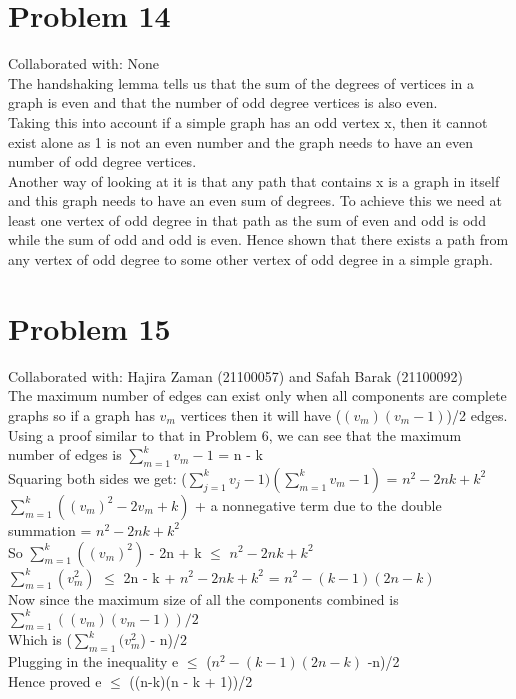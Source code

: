 \documentclass{article}
\begin{document}
\section{Problem 14}
Collaborated with: None\\
The handshaking lemma tells us that the sum of the degrees of vertices in a graph is even and that the number of odd degree vertices is also even. \\
Taking this into account if a simple graph has an odd vertex x, then it cannot exist alone as 1 is not an even number and the graph needs to have an even number of odd degree vertices. \\ 
Another way of looking at it is that any path that contains x is a graph in itself and this graph needs to have an even sum of degrees. To achieve this we need at least one vertex of odd degree in that path as the sum of even and odd is odd while the sum of odd and odd is even. Hence shown that there exists a path from any vertex of odd degree to some other vertex of odd degree in a simple graph.


\section{Problem 15}
Collaborated with: Hajira Zaman (21100057) and Safah Barak (21100092)\\
The maximum number of edges can exist only when all components are complete graphs so if a graph has $v_{m}$ vertices then it will have ($(v_{m})(v_{m}-1)$)/2 edges. \\Using a proof similar to that in Problem 6, we can see that the maximum number of edges is  $\sum_{m=1}^{k} v_{m}-1$ = n - k\\
Squaring both sides we get:
 ($\sum_{j=1}^{k} v_{j}-1)(\sum_{m=1}^{k} v_{m}-1)$ = $n^{2} - 2nk + k^{2}$ \\
 $\sum_{m=1}^{k} ((v_{m})^{2}- 2v_{m} + k)$ + a nonnegative term due to the double summation = $n^{2} - 2nk + k^{2}$  \\
So  $\sum_{m=1}^{k} ((v_{m})^{2})$ - 2n + k $\leq$ $n^{2} - 2nk + k^{2}$  \\
$\sum_{m=1}^{k} (v_{m}^{2})$ $\leq$ 2n - k + $n^{2} - 2nk + k^{2}$ = $n^{2} - (k-1)(2n-k)$  \\
Now since the maximum size of all the components combined is $\sum_{m=1}^{k} ((v_{m})(v_{m}-1))/2 $ \\
Which is ($\sum_{m=1}^{k} (v_{m}^{2}$) - n)/2 \\
Plugging in the inequality e $\leq$ ($n^{2} - (k-1)(2n-k)$ -n)/2 \\
Hence proved e $\leq$ ((n-k)(n - k + 1))/2 
\end{document}
